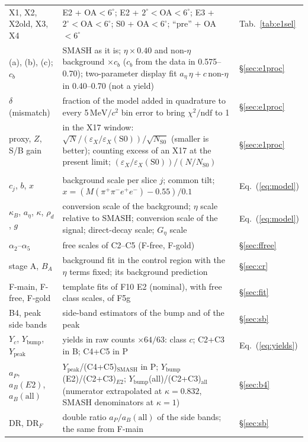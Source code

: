 \documentclass[11pt,a4paper]{article}
\newcommand{\Mfour}{\ensuremath{M(\pi^{+}\pi^{-}e^{+}e^{-})}\xspace}
\newcommand{\MeVcc}{\ensuremath{\mathrm{MeV}/c^{2}}\xspace}
\newcommand{\aEta}{\ensuremath{a_\eta}\xspace}
\newcommand{\aP}{\ensuremath{a_P}\xspace}
\newcommand{\Ybump}{\ensuremath{Y_{\mathrm{bump}}}\xspace}
\newcommand{\Ypeak}{\ensuremath{Y_{\mathrm{peak}}}\xspace}
\newcommand{\kB}{\ensuremath{\kappa_B}\xspace}
\newcommand{\rhod}{\ensuremath{\rho_d}\xspace}
\newcommand{\Geta}{\ensuremath{G_\eta}\xspace}
\newcommand{\cs}[1]{\textsf{#1}}%
\begin{document}
{\begin{longtable}{@{}>{\raggedright\arraybackslash}p{3.0cm} >{\raggedright\arraybackslash}p{\dimexpr\textwidth-3.0cm-2.0cm-4\tabcolsep\relax} >{\raggedright\arraybackslash}p{2.0cm}@{}}
\cs{X1}, \cs{X2}, \cs{X2old}, \cs{X3}, \cs{X4} & \cs{E2} + OA$<6^\circ$; \cs{E2} + $2^\circ<$OA$<6^\circ$; \cs{E3} + $2^\circ<$OA$<6^\circ$; S0 + OA$<6^\circ$; ``pre'' + OA$<6^\circ$ & Tab.~\ref{tab:e1sel} \\
(a), (b), (c); $c_b$ & SMASH as it is; $\eta\times0.40$ and non-$\eta$ background $\times c_b$ ($c_b$ from the data in 0.575--0.70); two-parameter display fit $a_\eta\,\eta+c\,$non-$\eta$ in 0.40--0.70 (not a yield) & \S\ref{sec:e1proc} \\
$\delta$ (mismatch) & fraction of the model added in quadrature to every 5\,\MeVcc bin error to bring $\chi^2/\mathrm{ndf}$ to 1 & \S\ref{sec:e1proc} \\
proxy, $Z$, S/B gain & in the X17 window: $\sqrt{N}/(\varepsilon_X/\varepsilon_X(\mathrm{S0}))/\sqrt{N_{\mathrm{S0}}}$ (smaller is better); counting excess of an X17 at the present limit; $(\varepsilon_X/\varepsilon_X(\mathrm{S0}))/(N/N_{\mathrm{S0}})$ & \S\ref{sec:e1proc} \\
\midrule
\multicolumn{3}{@{}l}{\textbf{Models, estimators and errors}} \\
$c_j$, $b$, $x$ & background scale per slice $j$; common tilt; $x=(\Mfour-0.55)/0.1$ & Eq.~(\ref{eq:model}) \\
\kB, \aEta, $\kappa$, \rhod, $g$ & conversion scale of the background; $\eta$ scale relative to SMASH; conversion scale of the signal; direct-decay scale; \Geta scale & Eq.~(\ref{eq:model}) \\
$\alpha_2$--$\alpha_5$ & free scales of C2--C5 (F-free, F-gold) & \S\ref{sec:ffree} \\
stage A, $B_A$ & background fit in the control region with the $\eta$ terms fixed; its background prediction & \S\ref{sec:cr} \\
F-main, F-free, F-gold & template fits of F10 E2 (nominal), with free class scales, of F5g & \S\ref{sec:fit} \\
B4, peak side bands & side-band estimators of the bump and of the peak & \S\ref{sec:sb} \\
$Y_c$, \Ybump, \Ypeak & yields in raw counts $\times64/63$: class $c$; C2+C3 in B; C4+C5 in P & Eq.~(\ref{eq:yields}) \\
\aP, $a_B(E2)$, $a_B(\mathrm{all})$ & \Ypeak/(C4+C5)$_{\mathrm{SMASH}}$ in P; \Ybump(E2)/(C2+C3)$_{E2}$; \Ybump(all)/(C2+C3)$_{\mathrm{all}}$ (numerator extrapolated at $\kappa=0.832$, SMASH denominators at $\kappa=1$) & \S\ref{sec:b4} \\
DR, DR$_F$ & double ratio $\aP/a_B(\mathrm{all})$ of the side bands; the same from F-main & \S\ref{sec:sb} \\

\end{longtable}}
\end{document}
